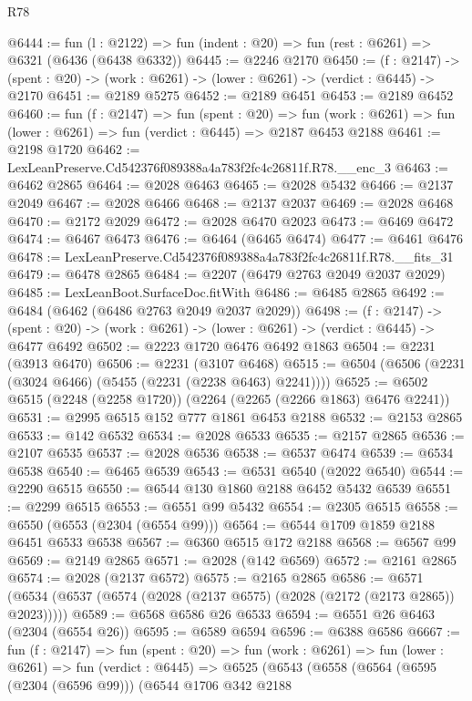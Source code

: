 \begin{lexlean}{R78}
\begin{coremodule}
@6444 := fun (l : @2122) => fun (indent : @20) => fun (rest : @6261) => @6321 (@6436 (@6438 @6332))
@6445 := @2246 @2170
@6450 := (f : @2147) ->
  (spent : @20) -> (work : @6261) -> (lower : @6261) -> (verdict : @6445) -> @2170
@6451 := @2189 @5275
@6452 := @2189 @6451
@6453 := @2189 @6452
@6460 := fun (f : @2147) =>
  fun (spent : @20) =>
  fun (work : @6261) => fun (lower : @6261) => fun (verdict : @6445) => @2187 @6453 @2188
@6461 := @2198 @1720
@6462 := LexLeanPreserve.Cd542376f089388a4a783f2fc4c26811f.R78.__enc_3
@6463 := @6462 @2865
@6464 := @2028 @6463
@6465 := @2028 @5432
@6466 := @2137 @2049
@6467 := @2028 @6466
@6468 := @2137 @2037
@6469 := @2028 @6468
@6470 := @2172 @2029
@6472 := @2028 @6470 @2023
@6473 := @6469 @6472
@6474 := @6467 @6473
@6476 := @6464 (@6465 @6474)
@6477 := @6461 @6476
@6478 := LexLeanPreserve.Cd542376f089388a4a783f2fc4c26811f.R78.__fits_31
@6479 := @6478 @2865
@6484 := @2207 (@6479 @2763 @2049 @2037 @2029)
@6485 := LexLeanBoot.SurfaceDoc.fitWith
@6486 := @6485 @2865
@6492 := @6484 (@6462 (@6486 @2763 @2049 @2037 @2029))
@6498 := (f : @2147) ->
  (spent : @20) -> (work : @6261) -> (lower : @6261) -> (verdict : @6445) -> @6477 @6492
@6502 := @2223 @1720 @6476 @6492 @1863
@6504 := @2231 (@3913 @6470)
@6506 := @2231 (@3107 @6468)
@6515 := @6504 (@6506 (@2231 (@3024 @6466) (@5455 (@2231 (@2238 @6463) @2241))))
@6525 := @6502 @6515 (@2248 (@2258 @1720)) (@2264 (@2265 (@2266 @1863) @6476 @2241))
@6531 := @2995 @6515 @152 @777 @1861 @6453 @2188
@6532 := @2153 @2865
@6533 := @142 @6532
@6534 := @2028 @6533
@6535 := @2157 @2865
@6536 := @2107 @6535
@6537 := @2028 @6536
@6538 := @6537 @6474
@6539 := @6534 @6538
@6540 := @6465 @6539
@6543 := @6531 @6540 (@2022 @6540)
@6544 := @2290 @6515
@6550 := @6544 @130 @1860 @2188 @6452 @5432 @6539
@6551 := @2299 @6515
@6553 := @6551 @99 @5432
@6554 := @2305 @6515
@6558 := @6550 (@6553 (@2304 (@6554 @99)))
@6564 := @6544 @1709 @1859 @2188 @6451 @6533 @6538
@6567 := @6360 @6515 @172 @2188
@6568 := @6567 @99
@6569 := @2149 @2865
@6571 := @2028 (@142 @6569)
@6572 := @2161 @2865
@6574 := @2028 (@2137 @6572)
@6575 := @2165 @2865
@6586 := @6571 (@6534 (@6537 (@6574 (@2028 (@2137 @6575) (@2028 (@2172 (@2173 @2865)) @2023)))))
@6589 := @6568 @6586 @26 @6533
@6594 := @6551 @26 @6463 (@2304 (@6554 @26))
@6595 := @6589 @6594
@6596 := @6388 @6586
@6667 := fun (f : @2147) =>
  fun (spent : @20) =>
  fun (work : @6261) =>
  fun (lower : @6261) =>
  fun (verdict : @6445) =>
  @6525
    (@6543
      (@6558
        (@6564
          (@6595 (@2304 (@6596 @99)))
          (@6544
            @1706
            @342
            @2188

\end{coremodule}
\end{lexlean}
